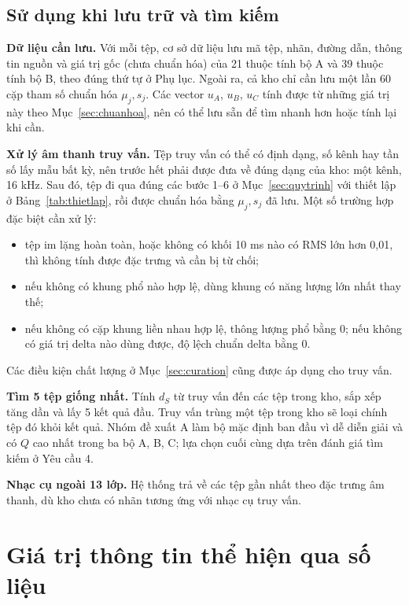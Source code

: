 \documentclass[11pt,a4paper]{article}
\begin{document}
\subsection{Sử dụng khi lưu trữ và tìm kiếm}\label{sec:sudung}
\textbf{Dữ liệu cần lưu.} Với mỗi tệp, cơ sở dữ liệu lưu mã tệp, nhãn, đường dẫn, thông tin nguồn và giá trị gốc (chưa chuẩn hóa) của 21 thuộc tính bộ A và 39 thuộc tính bộ B, theo đúng thứ tự ở Phụ lục. Ngoài ra, cả kho chỉ cần lưu một lần 60 cặp tham số chuẩn hóa $\mu_j, s_j$. Các vector $u_A$, $u_B$, $u_C$ tính được từ những giá trị này theo Mục~\ref{sec:chuanhoa}, nên có thể lưu sẵn để tìm nhanh hơn hoặc tính lại khi cần.

\textbf{Xử lý âm thanh truy vấn.} Tệp truy vấn có thể có định dạng, số kênh hay tần số lấy mẫu bất kỳ, nên trước hết phải được đưa về đúng dạng của kho: một kênh, 16 kHz. Sau đó, tệp đi qua đúng các bước 1--6 ở Mục~\ref{sec:quytrinh} với thiết lập ở Bảng~\ref{tab:thietlap}, rồi được chuẩn hóa bằng $\mu_j, s_j$ đã lưu. Một số trường hợp đặc biệt cần xử lý:
\begin{itemize}
\item tệp im lặng hoàn toàn, hoặc không có khối 10 ms nào có RMS lớn hơn 0,01, thì không tính được đặc trưng và cần bị từ chối;
\item nếu không có khung phổ nào hợp lệ, dùng khung có năng lượng lớn nhất thay thế;
\item nếu không có cặp khung liền nhau hợp lệ, thông lượng phổ bằng 0; nếu không có giá trị delta nào dùng được, độ lệch chuẩn delta bằng 0.
\end{itemize}
Các điều kiện chất lượng ở Mục~\ref{sec:curation} cũng được áp dụng cho truy vấn.

\textbf{Tìm 5 tệp giống nhất.} Tính $d_S$ từ truy vấn đến các tệp trong kho, sắp xếp tăng dần và lấy 5 kết quả đầu. Truy vấn trùng một tệp trong kho sẽ loại chính tệp đó khỏi kết quả. Nhóm đề xuất A làm bộ mặc định ban đầu vì dễ diễn giải và có $Q$ cao nhất trong ba bộ A, B, C; lựa chọn cuối cùng dựa trên đánh giá tìm kiếm ở Yêu cầu 4.

\textbf{Nhạc cụ ngoài 13 lớp.} Hệ thống trả về các tệp gần nhất theo đặc trưng âm thanh, dù kho chưa có nhãn tương ứng với nhạc cụ truy vấn.

\section{Giá trị thông tin thể hiện qua số liệu}\label{sec:sodo}
\end{document}
